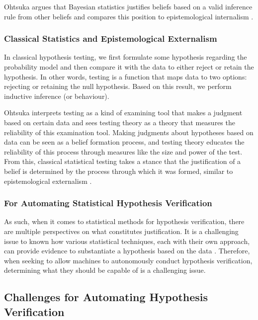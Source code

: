 \documentclass{book}
\begin{document}
Ohtsuka argues that Bayesian statistics justifies beliefs based on a valid inference rule from other beliefs and compares this position to epistemological internalism \cite{otsuka2022thinking}.

\subsubsection{Classical Statistics and Epistemological Externalism}
In classical hypothesis testing, we first formulate some hypothesis regarding the probability model and then compare it with the data to either reject or retain the hypothesis. In other words, testing is a function that maps data to two options: rejecting or retaining the null hypothesis. Based on this result, we perform inductive inference (or behaviour). 

Ohtsuka interprets testing as a kind of examining tool that makes a judgment based on certain data and sees testing theory as a theory that measures the reliability of this examination tool. Making judgments about hypotheses based on data can be seen as a belief formation process, and testing theory educates the reliability of this process through measures like the size and power of the test. From this, classical statistical testing takes a stance that the justification of a belief is determined by the process through which it was formed, similar to epistemological externalism \cite{otsuka2022thinking}.

\subsubsection{For Automating Statistical Hypothesis Verification}

As such, when it comes to statistical methods for hypothesis verification, there are multiple perspectives on what constitutes justification. It is a challenging issue to known how various statistical techniques, each with their own approach, can provide evidence to substantiate a hypothesis based on the data \cite{otsuka2022thinking,sober2008evidence,sep-statistics}. Therefore, when seeking to allow machines to autonomously conduct hypothesis verification, determining what they should be capable of is a challenging issue.

\subsection{Challenges for Automating Hypothesis Verification}
\end{document}
